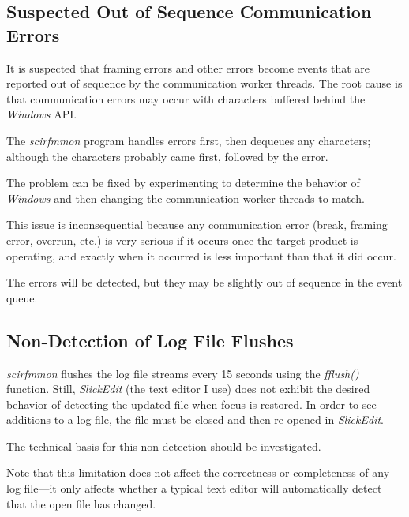 \documentclass[letterpaper,10pt,titlepage]{article}
\newcommand{\productname}{scirfmmon}
\newcommand{\productnameemph}{\emph{\productname}}
\begin{document}
\subsection{Suspected Out of Sequence Communication Errors}
\label{skli0:sose0}

It is suspected that framing errors and other errors become events
that are reported out of sequence by the communication worker threads.
The root cause is that communication errors may occur with characters 
buffered behind the \emph{Windows} API.

The \productnameemph{} program handles errors first, then dequeues any characters;
although the characters probably came first, followed by the error.

The problem can be fixed by experimenting to determine the behavior of
\emph{Windows} and then changing the communication worker threads to match.

This issue is inconsequential because any communication error
(break, framing error, overrun, etc.) is very serious if it occurs
once the target product is operating, and exactly when it occurred is
less important than that it did occur.

The errors will be detected,
but they may
be slightly out of sequence in the event queue.


\subsection{Non-Detection of Log File Flushes}
\label{skli0:sndf0}

\productnameemph{} flushes the log file streams every 15 seconds using
the \emph{fflush()} function.  Still, 
\emph{SlickEdit}
(the text editor I use) does not
exhibit the desired behavior of detecting the updated file when focus
is restored.  In order to see additions to a log file, the file must be
closed and then re-opened in \emph{SlickEdit}.

The technical basis for this non-detection should be investigated.

Note that this limitation does not affect the correctness or completeness
of any log file---it only affects whether a typical text editor will
automatically detect that the open file has changed.
\end{document}
